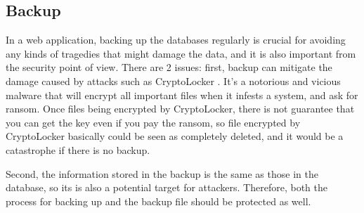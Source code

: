 \documentclass[conference]{IEEEtran}
\begin{document}
\subsection{Backup}
In a web application, backing up the databases regularly
is crucial for avoiding any kinds of tragedies that might damage
the data, and
it is also important
from the security point of view. There are 2 issues: first,
backup can mitigate the damage caused by attacks such as CryptoLocker \cite{cryptolocker}.
It's a notorious and vicious malware that will encrypt all important files
when it infests a system, and ask for ransom.
Once files being encrypted by CryptoLocker,
there is not guarantee that you can get the key even if you pay the ransom,
so file encrypted by CryptoLocker basically could be seen as completely deleted,
and it would be a catastrophe if there is no backup.

Second, the information stored in the backup is the same as those
in the database, so its
is also a potential target for attackers.
Therefore,
both the process for backing up and the backup file should be protected as well.
\end{document}
